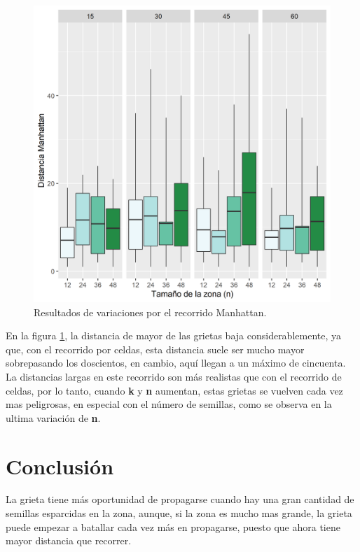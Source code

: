\documentclass{article}
\begin{document}
\begin{figure}[h!]
\centering\includegraphics[width=120mm]{Manhattan.png}
\caption{Resultados de variaciones por el recorrido Manhattan.}
\label{fig:Manhattan}
\end{figure}

En la figura \ref{fig:Manhattan}, la distancia de mayor de las grietas baja considerablemente, ya que, con el recorrido por celdas, esta distancia suele ser mucho mayor sobrepasando los doscientos, en cambio, aqu\'i llegan a un m\'aximo de cincuenta. La distancias largas en este recorrido son m\'as realistas que con el recorrido de celdas, por lo tanto, cuando \textbf{k} y \textbf{n} aumentan, estas grietas se vuelven cada vez mas peligrosas, en especial con el n\'umero de semillas, como se observa en la ultima variaci\'on de \textbf{n}.

\section{Conclusi\'on}

La grieta tiene m\'as oportunidad de propagarse cuando hay una gran cantidad de semillas esparcidas en la zona, aunque, si la zona es mucho mas grande, la grieta puede empezar a batallar cada vez m\'as en propagarse, puesto que ahora tiene mayor distancia que recorrer.



\end{document}
